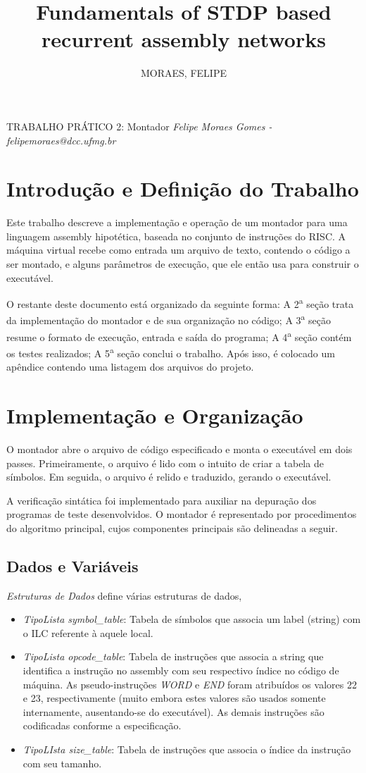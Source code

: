 \documentclass[12pt, a4paper]{article}
\author{MORAES, FELIPE}
\title{Fundamentals of STDP based recurrent assembly networks}
\begin{document}
\begin{center}
{\huge TRABALHO PRÁTICO 2: Montador}
\textit{Felipe Moraes Gomes - felipemoraes@dcc.ufmg.br}
\end{center}
\section{Introdução e Definição do Trabalho}
Este trabalho descreve a implementação e operação de um montador para uma linguagem assembly hipotética, baseada no conjunto de instruções do RISC. A máquina virtual recebe como entrada um arquivo de texto, contendo o código a ser montado, e alguns parâmetros de execução, que ele então usa para construir o executável.

O restante deste documento está organizado da seguinte forma: A 2\textsuperscript{a} seção trata da implementação do montador e de sua organização no código; A 3\textsuperscript{a} seção resume o formato de execução, entrada e saída do programa; A 4\textsuperscript{a} seção contém os testes realizados; A 5\textsuperscript{a} seção conclui o trabalho. Após isso, é colocado um apêndice contendo uma listagem dos arquivos do projeto. 

\section{Implementação e Organização}

O montador abre o arquivo de código especificado e monta o executável em dois passes. Primeiramente, o arquivo é lido com o intuito de criar a tabela de símbolos. Em seguida, o arquivo é relido e traduzido, gerando o executável. 

A verificação sintática foi implementado para auxiliar na depuração dos programas de teste desenvolvidos. O montador é representado por procedimentos do algoritmo principal, cujos componentes principais são delineadas a seguir.

\subsection{Dados e Variáveis}

\emph{Estruturas de Dados} define várias estruturas de dados, 

\begin{itemize}
	\item \emph{TipoLista symbol\_table}: Tabela de símbolos que associa um label (string) com o ILC referente à aquele local. 
	\item \emph{TipoLista opcode\_table}: Tabela de instruções que associa a string que identifica a instrução no assembly com seu respectivo índice no código de máquina. As pseudo-instruções \emph{WORD} e \emph{END} foram atribuídos os valores 22 e 23, respectivamente (muito embora estes valores são usados somente internamente, ausentando-se do executável). As demais instruções são codificadas conforme a especificação.
	\item \emph{TipoLIsta size\_table}: Tabela de instruções que associa o índice da instrução com seu tamanho.
\end{itemize}
\end{document}
